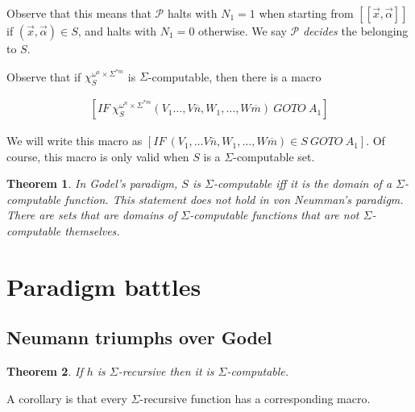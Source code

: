 \documentclass[a4paper, 12pt]{article}
\newtheorem{theorem}{Theorem}
\newtheorem{theorem}{Theorem}
\begin{document}
Observe that this means that $\mathcal{P}$ halts with $N_1 = 1$ when starting
from $[\![ \overrightarrow{x}, \overrightarrow{\alpha} ]\!]$ if
$(\overrightarrow{x}, \overrightarrow{\alpha}) \in S$, and halts with $N_1 = 0$
otherwise. We say $\mathcal{P}$ \textit{decides} the belonging to $S$.

Observe that if $\chi_S^{\omega^n \times \Sigma^{*m}}$ is $\Sigma$-computable,
then there is a macro 

\begin{align*}
    \left[ IF ~ \chi_S^{\omega^n \times \Sigma^{*m}} \left( V_1 \ldots, V
    \overline{n}, W_1, \ldots, W \overline{m} \right) ~ GOTO ~ A_1  \right] 
\end{align*}

We will write this macro as $\left[ IF ~ (V_1, \ldots V \overline{n}, W_1, \ldots,
W \overline{m}) \in S ~ GOTO ~ A_1 \right] $. Of course, this macro is only
valid when $S$ is a $\Sigma$-computable set.

\begin{theorem}
    In Godel's paradigm, $S$ is $\Sigma$-computable iff it is the domain of a
    $\Sigma$-computable function. This statement \textit{does not hold} in von
    Neumman's paradigm. There are sets that are domains of $\Sigma$-computable
    functions that are not $\Sigma$-computable themselves.
\end{theorem}

\pagebreak 

\section{Paradigm battles}

\subsection{Neumann triumphs over Godel}

\begin{theorem}
    If $h$ is $\Sigma$-recursive then it is $\Sigma$-computable.
\end{theorem}

A corollary is that every $\Sigma$-recursive function has a corresponding macro.
\end{document}
